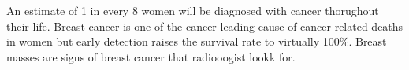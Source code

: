 An estimate of 1 in every 8 women will be diagnosed with cancer thorughout their life. 
Breast cancer is one of the  cancer  leading cause of cancer-related deaths in women but early detection raises the survival rate to virtually 100\%. Breast masses are signs of breast cancer that radiooogist lookk for. 



